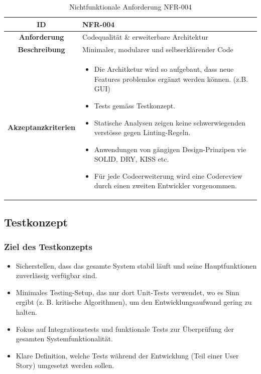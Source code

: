 \documentclass[a4paper,12pt]{report}
\begin{document}
    \begin{table}[h!]
        \centering
        \setlength{\leftmargini}{0.4cm}
        \begin{tabular}{|c|p{10cm}|}
            \hline
            \textbf{ID}           & NFR-004                                        \\ \hline
            \textbf{Anforderung}  & Codequalität \& erweiterbare Architektur       \\ \hline
            \textbf{Beschreibung} & Minimaler, modularer und selbserklärender Code \\ \hline
            \textbf{Akzeptanzkriterien} &
            \begin{itemize}
                \item Die Architketur wird so aufgebaut, dass neue Features problemlos ergänzt werden können. (z.B. GUI)
                \item Tests gemäss Testkonzept.
                \item Statische Analysen zeigen keine schwerwiegenden verstösse gegen Linting-Regeln.
                \item Anwendungen von gängigen Design-Prinzipen vie SOLID, DRY, KISS etc.
                \item Für jede Codeerweiterung wird eine Codereview durch einen zweiten Entwickler vorgenommen.
            \end{itemize}
            \\ \hline
        \end{tabular}
        \caption{Nichtfunktionale Anforderung NFR-004}\label{tab:table6}
    \end{table}

    \clearpage

    \subsection{Testkonzept}

    \subsubsection{Ziel des Testkonzepts}
    \begin{itemize}
        \item Sicherstellen, dass das gesamte System stabil läuft und seine Hauptfunktionen zuverlässig verfügbar sind.
        \item Minimales Testing-Setup, das nur dort Unit-Tests verwendet, wo es Sinn ergibt (z. B. kritische Algorithmen), um den Entwicklungsaufwand gering zu halten.
        \item Fokus auf Integrationstests und funktionale Tests zur Überprüfung der gesamten Systemfunktionalität.
        \item Klare Definition, welche Tests während der Entwicklung (Teil einer User Story) umgesetzt werden sollen.
    \end{itemize}
\end{document}
